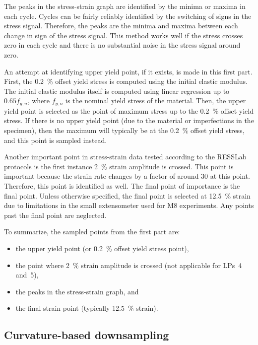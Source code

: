 \documentclass[a4paper,11pt]{article}
\begin{document}
The peaks in the stress-strain graph are identified by the minima or maxima in each cycle.
Cycles can be fairly reliably identified by the switching of signs in the stress signal.
Therefore, the peaks are the minima and maxima between each change in sign of the stress signal.
This method works well if the stress crosses zero in each cycle and there is no substantial noise in the stress signal around zero.

An attempt at identifying upper yield point, if it exists, is made in this first part.
First, the 0.2~\% offset yield stress is computed using the initial elastic modulus.
The initial elastic modulus itself is computed using linear regression up to $0.65 f_{y,n}$, where $f_{y,n}$ is the nominal yield stress of the material.
Then, the upper yield point is selected as the point of maximum stress up to the 0.2~\% offset yield stress.
If there is no upper yield point (due to the material or imperfections in the specimen), then the maximum will typically be at the 0.2~\% offset yield stress, and this point is sampled instead.

Another important point in stress-strain data tested according to the RESSLab protocols is the first instance 2~\% strain amplitude is crossed.
This point is important because the strain rate changes by a factor of around 30 at this point.
Therefore, this point is identified as well.
The final point of importance is the final point.
Unless otherwise specified, the final point is selected at 12.5~\% strain due to limitations in the small extensometer used for M8 experiments.
Any points past the final point are neglected.

To summarize, the sampled points from the first part are:
\begin{itemize}
    \item the upper yield point (or 0.2~\% offset yield stress point),
    \item the point where 2~\% strain amplitude is crossed (not applicable for LPs~4 and~5),
    \item the peaks in the stress-strain graph, and
    \item the final strain point (typically 12.5~\% strain).
\end{itemize}

\subsection{Curvature-based downsampling}
\end{document}
